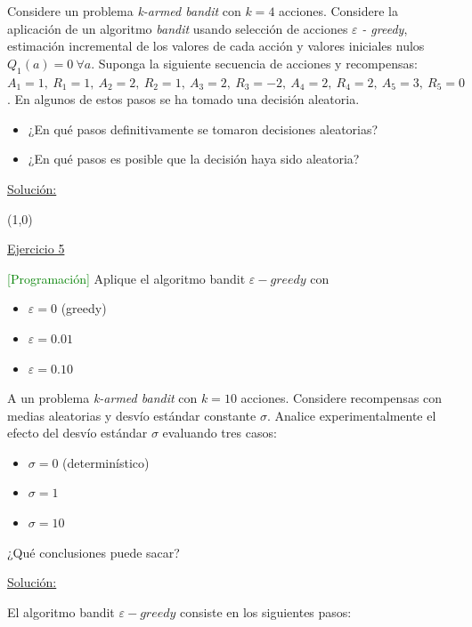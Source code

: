 \documentclass[12pt]{article}
\newlength\tindent
\renewcommand{\indent}{\hspace*{\tindent}}
\begin{document}
    Considere un problema \textit{k-armed bandit} con $k = 4$ acciones.
    Considere la aplicación de un algoritmo \textit{bandit} usando selección de acciones $\varepsilon$ \textit{- greedy}, estimación incremental de los valores de cada acción y valores iniciales nulos $Q_{1}(a) = 0\ \forall a$.
    Suponga la siguiente secuencia de acciones y recompensas: $A_{1}=1,\ R_{1}=1,\ A_{2}=2,\ R_{2}=1,\ A_{3}=2,\ R_{3}=-2,\ A_{4}=2,\ R_{4}=2,\ A_{5}=3,\ R_{5}=0$.
    En algunos de estos pasos se ha tomado una decisión aleatoria.

    \begin{itemize}
        \item ¿En qué pasos definitivamente se tomaron decisiones aleatorias?
        \item ¿En qué pasos es posible que la decisión haya sido aleatoria?
    \end{itemize}

    \indent\underline{Solución:}

    \lipsum[4]

    \line(1,0){\textwidth}


    \indent\underline{Ejercicio 5}

    \textcolor{green}{[Programación]} Aplique el algoritmo bandit $\varepsilon-greedy$ con
    \begin{itemize}
        \item $\varepsilon=0$ (greedy)
        \item $\varepsilon=0.01$
        \item $\varepsilon=0.10$
    \end{itemize}

    A un problema \textit{k-armed bandit} con $k=10$ acciones.
    Considere recompensas con medias aleatorias y desvío estándar constante $\sigma$.
    Analice experimentalmente el efecto del desvío estándar $\sigma$ evaluando tres casos:
    \begin{itemize}
        \item $\sigma=0$ (determinístico)
        \item $\sigma=1$
        \item $\sigma=10$
    \end{itemize}

    ¿Qué conclusiones puede sacar?

    \indent\underline{Solución:}

    El algoritmo bandit $\varepsilon-greedy$ consiste en los siguientes pasos:
\end{document}
